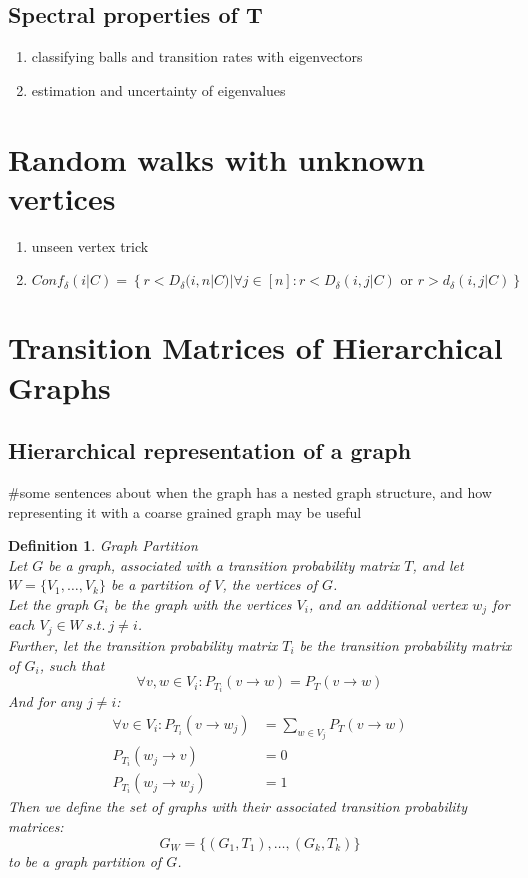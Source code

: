 \documentclass{article}
\newtheorem{definition}{Definition}
\begin{document}
\subsection{Spectral properties of T}
\begin{enumerate}
    \item classifying balls and transition rates with eigenvectors
    \item estimation and uncertainty of eigenvalues
    
\end{enumerate}
\section{Random walks with unknown vertices}

\begin{enumerate}
    \item unseen vertex trick
    \item  $Conf_\delta(i|C) = \left\{ r<D_\delta(i,n|C) | \forall j\in [n] : r < D_{\delta}(i,j|C) \text{ or } r > d_{\delta}(i,j|C)\right\}$
\end{enumerate}

\section{Transition Matrices of Hierarchical Graphs}
\subsection{Hierarchical representation of a graph}
\#some sentences about when the graph has a nested graph structure, and how representing it with a coarse grained graph may be useful
\begin{definition}
    Graph Partition \\
    Let $G$ be a graph, associated with a transition probability matrix $T$, and let $W = \{V_1, \dots, V_k\}$ be a partition of $V$, the vertices of $G$. \\
    Let the graph $G_i$ be the graph with the vertices $V_i$, and an additional vertex $w_j$ for each $V_j\in W\ s.t.\ j\neq i$.\\
    Further, let the transition probability matrix $T_i$ be the transition probability matrix of $G_i$, such that 
\[
    \forall v,w\in V_i : P_{T_i}(v\rightarrow w) = P_{T}(v\rightarrow w)
\]
     And for any $j \neq i$: 
\begin{align}
    \forall v\in V_i : P_{T_i}(v\rightarrow w_j) & = \sum_{w\in V_j} P_{T}(v \rightarrow w)\nonumber\\
    P_{T_i}(w_j\rightarrow v) & = 0 \nonumber\\
    P_{T_i}(w_j\rightarrow w_j) & = 1 \nonumber
\end{align}
    Then we define the set of graphs with their associated transition probability matrices:
   \[
       G_{W} = \{(G_1, T_1), \dots, (G_k, T_k)\}
   \]  
    to be a graph partition of $G$.
\end{definition}
\end{document}
